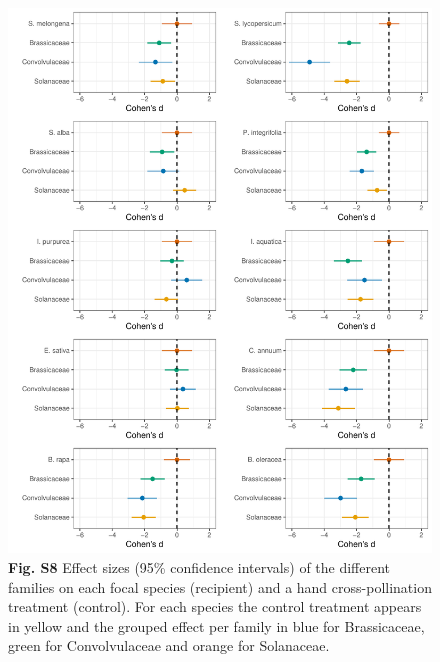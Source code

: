 \documentclass[
  12pt,
]{article}
\begin{document}
\newpage

\begin{figure}
\centering
\includegraphics{Supp_Material_files/figure-latex/unnamed-chunk-11-1.pdf}
\caption{\textbf{Fig. S8} Effect sizes (95\% confidence intervals) of
the different families on each focal species (recipient) and a hand
cross-pollination treatment (control). For each species the control
treatment appears in yellow and the grouped effect per family in blue
for Brassicaceae, green for Convolvulaceae and orange for Solanaceae.}
\end{figure}
\end{document}
